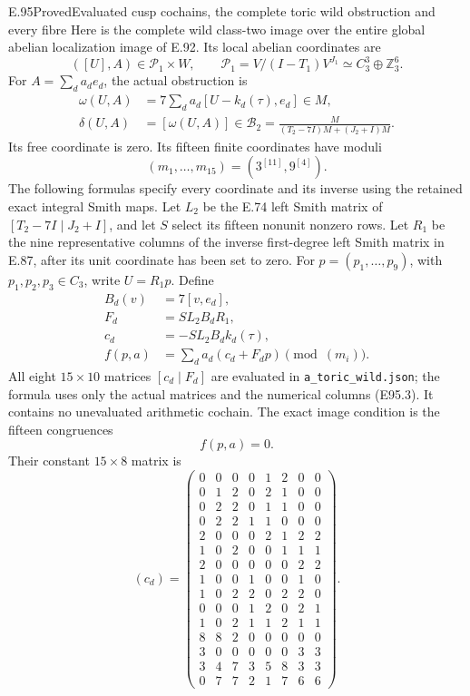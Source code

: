 \begin{statement}{E.95}{Proved}{Evaluated cusp cochains, the complete toric wild obstruction and every fibre}
Here is the complete wild class-two image over the entire
global abelian localization image of E.92. Its local abelian
coordinates are
\[
 ([U],A)\in\mathcal P_1\times W,
 \qquad
 \mathcal P_1=V/(I-T_1)V^{J_1}\simeq C_3^3\oplus\mathbb Z_3^6.
 \tag{E95.4}
\]
For $A=\sum_d a_de_d$, the actual obstruction is
\[
 \begin{aligned}
 \omega(U,A)&=7\sum_d a_d[U-k_d(\tau),e_d]\in M,\\
 \delta(U,A)&=[\omega(U,A)]\in
 \mathcal B_2=\frac{M}{(T_2-7I)M+(J_2+I)M}.
 \end{aligned}
 \tag{E95.5}
\]
Its free coordinate is zero. Its fifteen finite coordinates
have moduli
\[
             (m_1,\ldots,m_{15})=(3^{[11]},9^{[4]}).
 \tag{E95.6}
\]
The following formulas specify every coordinate and its
inverse using the retained exact integral Smith maps.
Let $L_2$ be the E.74 left Smith matrix of
$[T_2-7I\mid J_2+I]$, and let $S$ select its fifteen
nonunit nonzero rows. Let $R_1$ be the nine representative
columns of the inverse first-degree left Smith matrix in
E.87, after its unit coordinate has been set to zero.
For $p=(p_1,\ldots,p_9)$, with $p_1,p_2,p_3\in C_3$,
write $U=R_1p$. Define
\[
 \begin{split}
 B_d(v)&=7[v,e_d],\\
 F_d&=SL_2B_dR_1,\\
 c_d&=-SL_2B_dk_d(\tau),\\
 f(p,a)&=\sum_d a_d(c_d+F_dp)\pmod{(m_i)}.
 \end{split}
 \tag{E95.7}
\]
All eight $15\times10$ matrices $[c_d\mid F_d]$ are
evaluated in \texttt{a\_toric\_wild.json}; the formula uses
only the actual matrices and the numerical columns (E95.3).
It contains no unevaluated arithmetic cochain. The exact
image condition is the fifteen congruences
\[
                        f(p,a)=0.
 \tag{E95.8}
\]
Their constant $15\times8$ matrix is
\[
 (c_d)=\begin{pmatrix}
0&0&0&0&1&2&0&0\\
0&1&2&0&2&1&0&0\\
0&2&2&0&1&1&0&0\\
0&2&2&1&1&0&0&0\\
2&0&0&0&2&1&2&2\\
1&0&2&0&0&1&1&1\\
2&0&0&0&0&0&2&2\\
1&0&0&1&0&0&1&0\\
1&0&2&2&0&2&2&0\\
0&0&0&1&2&0&2&1\\
1&0&2&1&1&2&1&1\\
8&8&2&0&0&0&0&0\\
3&0&0&0&0&0&3&3\\
3&4&7&3&5&8&3&3\\
0&7&7&2&1&7&6&6
\end{pmatrix}.
 \tag{E95.9}
\]


\end{statement}
